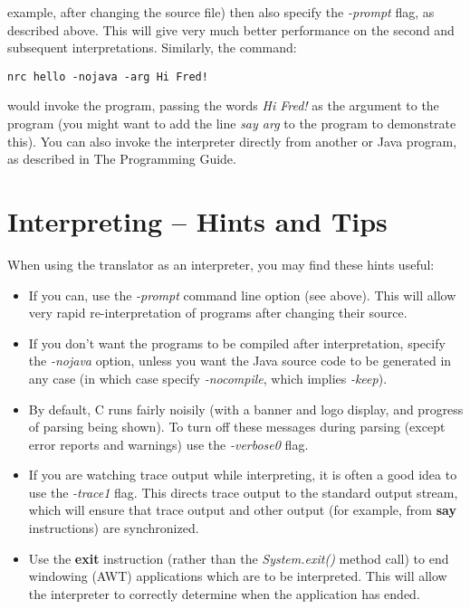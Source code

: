 example, after changing the source file) then also specify
the \emph{-prompt} flag, as described above.  This will give very much
better performance on the second and subsequent interpretations.
\newline
Similarly, the command:
\begin{verbatim}
nrc hello -nojava -arg Hi Fred!
\end{verbatim}
would invoke the program, passing the words \emph{Hi Fred!} as
the argument to the program (you might want to add the line \emph{say
arg} to the program to demonstrate this).
\newline
You can also invoke the interpreter directly from another \nr{} or
Java program, as described in The \nr{} Programming Guide.

\section{Interpreting -- Hints and Tips}

When using the translator as an interpreter, you may find these hints
useful:
\begin{itemize}
\item If you can, use the \emph{-prompt} command line option (see above).
This will allow very rapid re-interpretation of programs after changing
their source.
\item If you don't want the programs to be compiled after interpretation,
specify the \emph{-nojava} option, unless you want the Java source code
to be generated in any case (in which case specify \emph{-nocompile},
which implies \emph{-keep}).
\item By default, \nr{}C runs fairly noisily (with a banner and logo
display, and progress of parsing being shown).  To turn off these
messages during parsing (except error reports and warnings) use
the \emph{-verbose0} flag.
\item
{}
If you are watching \nr{} trace output while interpreting, it is often
a good idea to use the \emph{-trace1} flag.  This directs trace output
to the standard output stream, which will ensure that trace output and
other output (for example, from \textbf{say} instructions) are
synchronized.
\item
Use the \nr{} \textbf{exit} instruction (rather than the \emph{System.exit()}
method call) to end windowing (AWT) applications which are to be
interpreted.  This will allow the interpreter to correctly determine
when the application has ended.
\end{itemize}


